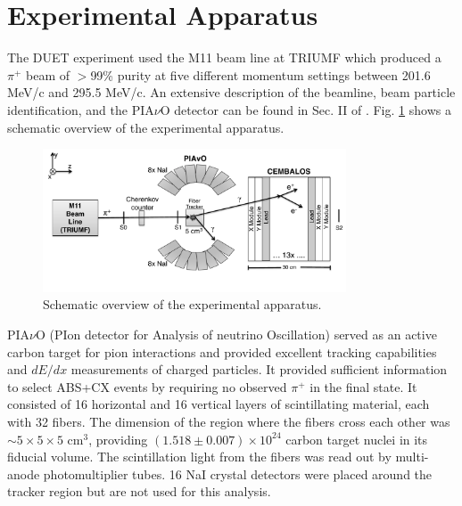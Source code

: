 \section{Experimental Apparatus}\label{sec:experiment}
The DUET experiment used the M11 beam line at TRIUMF which produced a $\pi^{+}$ beam of $>$99\% purity at five different momentum settings between 201.6 MeV/c and 295.5 MeV/c. An extensive description of the beamline, beam particle identification, and the PIA$\nu$O detector can be found in Sec. II of \cite{duet}. Fig.  \ref{fig:config} shows a schematic overview of the experimental apparatus.

\begin{figure}[ht]
\includegraphics[width=90mm]{figures/duet_schematic_forpaper_v2.pdf}
\caption{Schematic overview of the experimental apparatus.}
\label{fig:config}
\end{figure}


PIA$\nu$O (PIon detector for Analysis of neutrino Oscillation) served as an active carbon target for pion interactions and  provided excellent tracking capabilities and $dE/dx$ measurements of charged particles. It provided sufficient information to select ABS+CX events by requiring no observed $\pi^{+}$ in the final state. It consisted of 16 horizontal and 16 vertical layers of scintillating material, each with 32 fibers. The dimension of the region where the fibers cross each other was $\sim5\times5\times5$ cm$^3$, providing $(1.518\pm0.007)\times10^{24}$ carbon target nuclei in its fiducial volume. The scintillation light from the fibers was read out by multi-anode photomultiplier tubes. 16 NaI crystal detectors were placed around the tracker region but are not used for this analysis.

